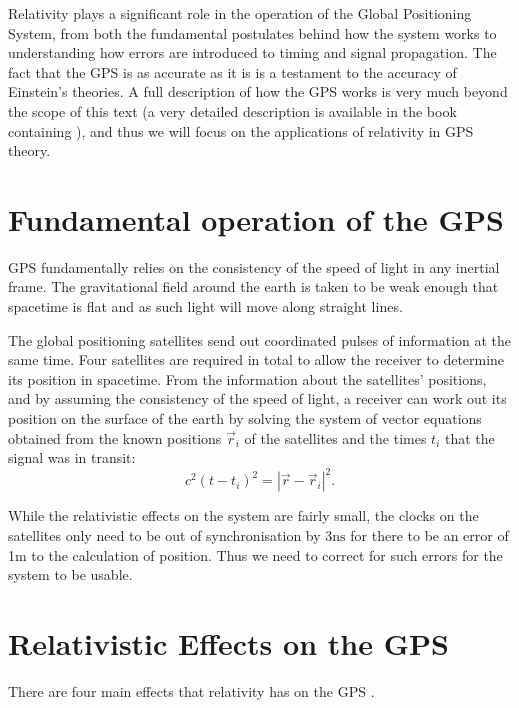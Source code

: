 
Relativity plays a significant role in the operation of the Global Positioning System, from both the fundamental postulates behind how the system works to understanding how errors are introduced to timing and signal propagation. The fact that the GPS is as accurate as it is is a testament to the accuracy of Einstein's theories. A full description of how the GPS works is very much beyond the scope of this text (a very detailed description is available in the book containing \cite{ashby}), and thus we will focus on the applications of relativity in GPS theory.

\section{Fundamental operation of the GPS}

GPS fundamentally relies on the consistency of the speed of light in any inertial frame. The gravitational field around the earth is taken to be weak enough that spacetime is flat and as such light will move along straight lines. 

The global positioning satellites send out coordinated pulses of information at the same time. Four satellites are required in total to allow the receiver to determine its position in spacetime. From the information about the satellites' positions, and by assuming the consistency of the speed of light, a receiver can work out its position on the surface of the earth by solving the system of vector equations obtained from the known positions \(\vec{r}_i\) of the satellites and the times \(t_i\) that the signal was in transit:
\begin{equation} \label{gps-vec}
c^2 (t-t_i)^2 = |\vec{r}-\vec{r}_i|^2  .
\end{equation}

While the relativistic effects on the system are fairly small, the clocks on the satellites only need to be out of synchronisation by $3\text{ns}$ for there to be an error of 1m to the calculation of position. Thus we need to correct for such errors for the system to be usable. 

\section{Relativistic Effects on the GPS}

There are four main effects that relativity has on the GPS \cite{ashby}.

